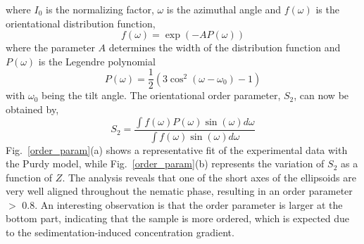 \documentclass[aps,prl,preprint,superscriptaddress,showkeys]{revtex4-2} %
\begin{document}
\noindent where $I_0$ is the normalizing factor, $\omega$ is the azimuthal angle and $f(\omega)$ is the orientational distribution function,
\begin{equation}
\label{eq3:}
f(\omega)=\exp(-AP(\omega))
\end{equation} 
\noindent where the parameter $A$ determines the width of the distribution function and $P(\omega)$ is the Legendre polynomial
\begin{equation}
\label{eq4:}
P(\omega)=\frac{1}{2}(3\cos^2(\omega-\omega_0)-1)
\end{equation} 
\noindent with $\omega_0$ being the tilt angle. The orientational order parameter, $S_2$, can now be obtained by,
\begin{equation}
\label{eq5:}
S_2= \frac{\int f(\omega)P(\omega)\sin(\omega)d\omega}{\int f(\omega)\sin(\omega)d\omega}
\end{equation}
\noindent Fig.~\ref{order_param}(a) shows a representative fit of the experimental data with the Purdy model, while Fig.~\ref{order_param}(b) represents the variation of $S_2$ as a function of $Z$. The analysis reveals that one of the short axes of the ellipsoids are very well aligned throughout the nematic phase, resulting in an order parameter $>$ 0.8. An interesting observation is that the order parameter is larger at the bottom part, indicating that the sample is more ordered, which is expected due to the sedimentation-induced concentration gradient.\par
\end{document}
